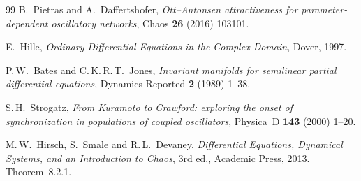 \documentclass[11pt,a4paper]{article}
\theoremstyle{definition}
\begin{document}
\begin{thebibliography}{99}
B.~Pietras and A.~Daffertshofer, \emph{Ott--Antonsen attractiveness for parameter-dependent oscillatory networks}, Chaos \textbf{26} (2016) 103101.

E.~Hille, \emph{Ordinary Differential Equations in the Complex Domain}, Dover, 1997.

P.\,W.~Bates and C.\,K.\,R.\,T.~Jones, \emph{Invariant manifolds for semilinear partial differential equations}, Dynamics Reported \textbf{2} (1989) 1--38.

S.\,H.~Strogatz, \emph{From Kuramoto to Crawford: exploring the onset of synchronization in populations of coupled oscillators}, Physica~D \textbf{143} (2000) 1--20.

M.\,W.~Hirsch, S.~Smale and R.\,L.~Devaney, \emph{Differential Equations, Dynamical Systems, and an Introduction to Chaos}, 3rd ed., Academic Press, 2013. Theorem~8.2.1.

\end{thebibliography}
\end{document}
